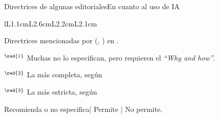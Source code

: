 \begin{frame}{Directrices de algunas editoriales}{En cuanto al uso de IA}
\begin{threeparttable}
\begin{tabular}{lL{1.1cm}L{2.6cm}L{2.2cm}L{2.1cm}}
        \end{tabular}
    \end{threeparttable}
    \begin{tablenotes}\footnotesize\color{colorC}
        \item[] Directrices mencionadas por (\citeauthor{Kendall2024}, \citeyear{Kendall2024}) en \cite{Kendall2024}.
        \item[] $^\red{1}$ Muchas no lo especifican, pero requieren el \textit{``Why and how''}.
        \item[] $^\red{2}$ La más completa, según \cite{Kendall2024}
        \item[] $^\red{3}$ La más estricta, según \cite{Kendall2024}
        \item[] \QuestionCircle Recomienda o no especifica| \chekeYes Permite | \chekeNot No permite.
    \end{tablenotes}
\end{frame}
